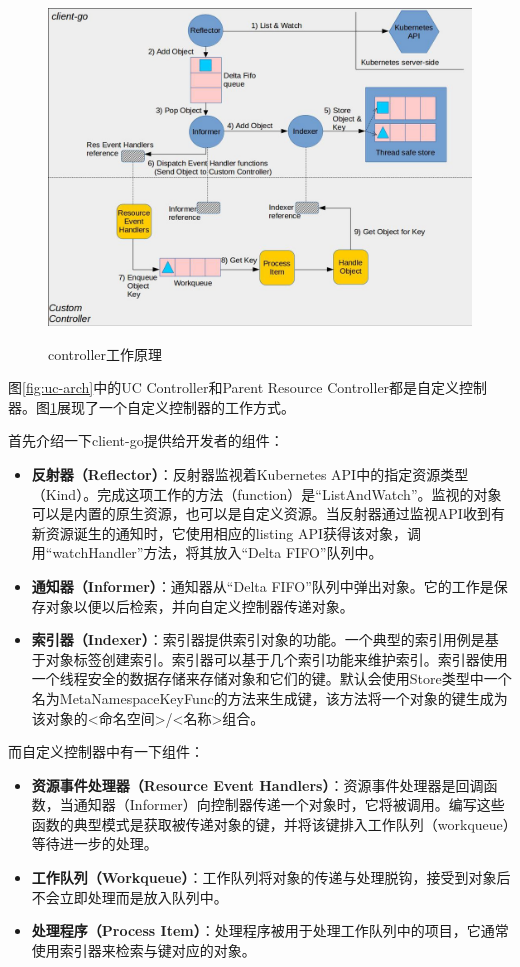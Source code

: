 \documentclass[macfonts,master]{njuthesis}
\begin{document}
\begin{figure}[htbp]
  \centering
  \includegraphics[width= 1\textwidth]{pics/client-go-controller-interaction.jpeg}\\
  \caption{controller工作原理\cite{controllerclientgo}}\label{fig:client-go-controller}
\end{figure}

图\ref{fig:uc-arch}中的UC Controller和Parent Resource Controller都是自定义控制器。图\ref{fig:client-go-controller}展现了一个自定义控制器的工作方式。

首先介绍一下client-go提供给开发者的组件：
\begin{itemize}
	\item \textbf{反射器（Reflector）}：反射器监视着Kubernetes API中的指定资源类型（Kind）。完成这项工作的方法（function）是“ListAndWatch”。监视的对象可以是内置的原生资源，也可以是自定义资源。当反射器通过监视API收到有新资源诞生的通知时，它使用相应的listing API获得该对象，调用“watchHandler”方法，将其放入“Delta FIFO”队列中。
	\item \textbf{通知器（Informer）}：通知器从“Delta FIFO”队列中弹出对象。它的工作是保存对象以便以后检索，并向自定义控制器传递对象。
	\item \textbf{索引器（Indexer）}：索引器提供索引对象的功能。一个典型的索引用例是基于对象标签创建索引。索引器可以基于几个索引功能来维护索引。索引器使用一个线程安全的数据存储来存储对象和它们的键。默认会使用Store类型中一个名为MetaNamespaceKeyFunc的方法来生成键，该方法将一个对象的键生成为该对象的<命名空间>/<名称>组合。
\end{itemize}

而自定义控制器中有一下组件：
\begin{itemize}
	\item \textbf{资源事件处理器（Resource Event Handlers）}：资源事件处理器是回调函数，当通知器（Informer）向控制器传递一个对象时，它将被调用。编写这些函数的典型模式是获取被传递对象的键，并将该键排入工作队列（workqueue）等待进一步的处理。
	\item \textbf{工作队列（Workqueue）}：工作队列将对象的传递与处理脱钩，接受到对象后不会立即处理而是放入队列中。
	\item \textbf{处理程序（Process Item）}：处理程序被用于处理工作队列中的项目，它通常使用索引器来检索与键对应的对象。
\end{itemize}
\end{document}
